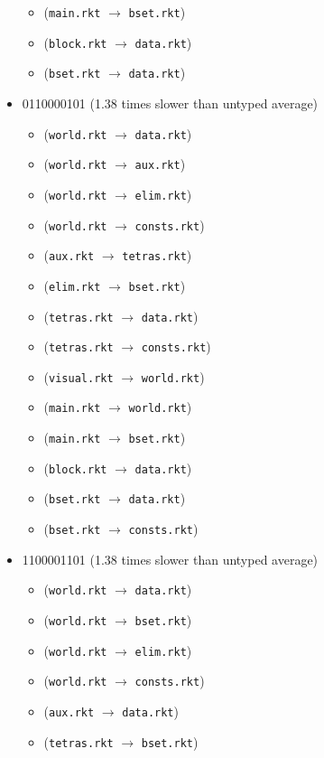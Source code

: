 \documentclass{article}
\newcommand{\mono}[1]{\texttt{#1}}
\begin{document}
\begin{itemize}
\begin{itemize}
  \item (\mono{main.rkt} $\rightarrow$ \mono{bset.rkt})
  \item (\mono{block.rkt} $\rightarrow$ \mono{data.rkt})
  \item (\mono{bset.rkt} $\rightarrow$ \mono{data.rkt})
  \end{itemize}
\item 0110000101 (1.38 times slower than untyped average)
  \begin{itemize}
  \item (\mono{world.rkt} $\rightarrow$ \mono{data.rkt})
  \item (\mono{world.rkt} $\rightarrow$ \mono{aux.rkt})
  \item (\mono{world.rkt} $\rightarrow$ \mono{elim.rkt})
  \item (\mono{world.rkt} $\rightarrow$ \mono{consts.rkt})
  \item (\mono{aux.rkt} $\rightarrow$ \mono{tetras.rkt})
  \item (\mono{elim.rkt} $\rightarrow$ \mono{bset.rkt})
  \item (\mono{tetras.rkt} $\rightarrow$ \mono{data.rkt})
  \item (\mono{tetras.rkt} $\rightarrow$ \mono{consts.rkt})
  \item (\mono{visual.rkt} $\rightarrow$ \mono{world.rkt})
  \item (\mono{main.rkt} $\rightarrow$ \mono{world.rkt})
  \item (\mono{main.rkt} $\rightarrow$ \mono{bset.rkt})
  \item (\mono{block.rkt} $\rightarrow$ \mono{data.rkt})
  \item (\mono{bset.rkt} $\rightarrow$ \mono{data.rkt})
  \item (\mono{bset.rkt} $\rightarrow$ \mono{consts.rkt})
  \end{itemize}
\item 1100001101 (1.38 times slower than untyped average)
  \begin{itemize}
  \item (\mono{world.rkt} $\rightarrow$ \mono{data.rkt})
  \item (\mono{world.rkt} $\rightarrow$ \mono{bset.rkt})
  \item (\mono{world.rkt} $\rightarrow$ \mono{elim.rkt})
  \item (\mono{world.rkt} $\rightarrow$ \mono{consts.rkt})
  \item (\mono{aux.rkt} $\rightarrow$ \mono{data.rkt})
  \item (\mono{tetras.rkt} $\rightarrow$ \mono{bset.rkt})

\end{itemize}
\end{itemize}
\end{document}
